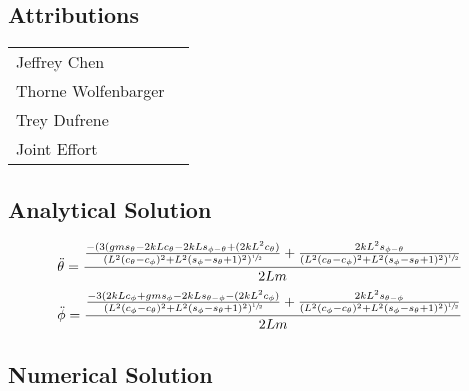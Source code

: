\documentclass[12pt]{report}
\begin{document}
\begin{flushleft}
\subsection{Attributions}
\onehalfspacing
\begin{tabular}{ll}
Jeffrey Chen & \\
Thorne Wolfenbarger &\\
Trey Dufrene & \\
Joint Effort &
\end{tabular}
\singlespacing

\newpage
\subsection{Analytical Solution}
\begin{equation}
  \ddot{\theta} = \frac{\frac{-(3(gms_{\theta} - 2kLc_{\theta} - 2kLs_{\phi - \theta} + (2kL^2c_{\theta})}{(L^2(c_{\theta} - c_{\phi})^2 + L^2(s_{\phi} - s_{\theta} + 1)^2)^{\sfrac{1}{2}}}
  + \frac{2kL^2s_{\phi - \theta}}{(L^2(c_{\theta} - c_{\phi})^2 + L^2(s_{\phi} - s_{\theta} + 1)^2)^{\sfrac{1}{2}}}}{2Lm}
  \label{eq:thetanasty}
\end{equation}
\begin{equation}
  \ddot{\phi} = \frac{\frac{-3(2kLc_{\phi} + gms_{\phi} - 2kLs_{\theta - \phi} - (2kL^2c_{\phi})}{(L^2(c_{\phi} - c_{\theta})^2 + L^2(s_{\phi} - s_{\theta} + 1)^2)^{\sfrac{1}{2}}} + \frac{2kL^2s_{\theta - \phi}}{(L^2(c_{\phi} - c_{\theta})^2 + L^2(s_{\phi} - s_{\theta} + 1)^2)^{\sfrac{1}{2}}}}{2Lm}
  \label{eq:phinasty}
\end{equation}


\newpage
\subsection{Numerical Solution}
\label{appendix:numerical}


\end{flushleft}
\end{document}
